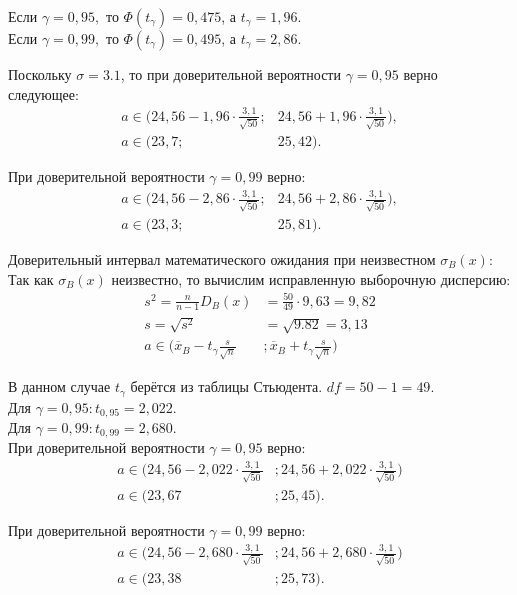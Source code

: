 \documentclass[utf8, a4paper, 14pt, russian, oneside]{book}
\begin{document}
Если $\gamma = 0,95,$ то $\Phi(t_\gamma) = 0,475$, а $t_\gamma = 1,96$.\\
Если $\gamma = 0,99,$ то $\Phi(t_\gamma) = 0,495$, а $t_\gamma = 2,86$.

Поскольку $\sigma = 3.1$, то при доверительной вероятности $\gamma = 0,95$ верно следующее:
\begin{align*}
    a \in \Big(24,56 - 1,96\cdot \frac{3,1}{\sqrt{50}}; & 24,56 + 1,96\cdot \frac{3,1}{\sqrt{50}}\Big), \\
    a \in ( 23,7; & 25,42 ).
\end{align*}

При доверительной вероятности $\gamma=0,99$ верно:
\begin{align*}
    a \in \Big(24,56 - 2,86\cdot \frac{3,1}{\sqrt{50}}; & 24,56 + 2,86\cdot \frac{3,1}{\sqrt{50}}\Big), \\
    a \in ( 23,3; & 25,81 ).
\end{align*}

Доверительный интервал математического ожидания при неизвестном $\sigma_B(x)$:
Так как $\sigma_B(x)$ неизвестно, то вычислим исправленную выборочную дисперсию:
\begin{align*}
    s^2 = \frac{n}{n-1}D_B(x) &= \frac{50}{49} \cdot 9,63 = 9,82 \\
    s = \sqrt{s^2} &= \sqrt{9.82} = 3,13 \\ 
    a \in \Big( \overline{x}_B - t_\gamma\frac{s}{\sqrt{n}}&; \overline{x}_B + t_\gamma\frac{s}{\sqrt{n}} \Big)
\end{align*}

В данном случае $t_\gamma$ берётся из таблицы Стьюдента. $df = 50 - 1 = 49$.\\
Для $\gamma = 0,95: t_{0,95} = 2,022.$\\
Для $\gamma = 0,99: t_{0,99} = 2,680.$\\

При доверительной вероятности $\gamma=0,95$ верно:
\begin{align*}
    a \in \Big( 24,56 - 2,022 \cdot \frac{3,1}{\sqrt{50}} &; 24,56 + 2,022 \cdot \frac{3,1}{\sqrt{50}} \Big)\\
    a \in ( 23,67 &; 25,45).
\end{align*}

При доверительной вероятности $\gamma=0,99$ верно:
\begin{align*}
    a \in \Big( 24,56 - 2,680 \cdot \frac{3,1}{\sqrt{50}} &; 24,56 + 2,680 \cdot \frac{3,1}{\sqrt{50}} \Big)\\
    a \in ( 23,38 &; 25,73).
\end{align*}
\end{document}
